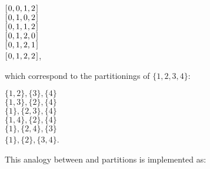 \documentclass{scrreprt}
\begin{document}
\begin{minipage}{\textwidth}
\ensuremath{[\mskip1.5mu \mathrm{0},\mathrm{0},\mathrm{1},\mathrm{2}\mskip1.5mu]}\\
\ensuremath{[\mskip1.5mu \mathrm{0},\mathrm{1},\mathrm{0},\mathrm{2}\mskip1.5mu]}\\
\ensuremath{[\mskip1.5mu \mathrm{0},\mathrm{1},\mathrm{1},\mathrm{2}\mskip1.5mu]}\\
\ensuremath{[\mskip1.5mu \mathrm{0},\mathrm{1},\mathrm{2},\mathrm{0}\mskip1.5mu]}\\
\ensuremath{[\mskip1.5mu \mathrm{0},\mathrm{1},\mathrm{2},\mathrm{1}\mskip1.5mu]}\\
\ensuremath{[\mskip1.5mu \mathrm{0},\mathrm{1},\mathrm{2},\mathrm{2}\mskip1.5mu]},
\end{minipage}

which correspond to the partitionings of $\lbrace 1,2,3,4\rbrace$:

\begin{minipage}{\textwidth}
$\lbrace 1,2\rbrace, \lbrace 3  \rbrace, \lbrace 4  \rbrace$\\
$\lbrace 1,3\rbrace, \lbrace 2  \rbrace, \lbrace 4  \rbrace$\\
$\lbrace 1  \rbrace, \lbrace 2,3\rbrace, \lbrace 4  \rbrace$\\
$\lbrace 1,4\rbrace, \lbrace 2  \rbrace, \lbrace 4  \rbrace$\\
$\lbrace 1  \rbrace, \lbrace 2,4\rbrace, \lbrace 3  \rbrace$\\
$\lbrace 1  \rbrace, \lbrace 2  \rbrace, \lbrace 3,4\rbrace$.
\end{minipage}

This analogy between  and partitions is implemented as:
\end{document}
